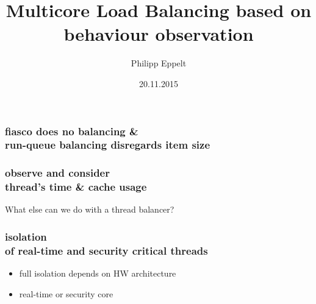 \documentclass[utf8,10pt]{beamer}
\title[]{Multicore Load Balancing based on behaviour observation}
\author{Philipp Eppelt}
\date{20.11.2015}
\begin{document}
\maketitle

\large

\newcommand{\ft}[1]{\frametitle{\hfill #1}}


\begin{frame}
  \frametitle{fiasco does no balancing \& \\ run-queue balancing disregards
  item size}
  \centering
  \begin{minipage}[l]{.49\columnwidth}
    
  \end{minipage}
  \begin{minipage}[r]{.49\columnwidth}
    
  \end{minipage}
\end{frame}


\begin{frame}
  \frametitle{observe and consider \\ thread's time \& cache usage}
  \centering
  \begin{minipage}[l]{.49\columnwidth}
    
  \end{minipage}
  \begin{minipage}[r]{.49\columnwidth}
    
  \end{minipage}
\end{frame}


\begin{frame}
  \centering
  What else can we do with a thread balancer?
\end{frame}


\begin{frame}
  \frametitle{isolation \\of real-time and security critical threads}

  \begin{itemize}
    \item full isolation depends on HW architecture
    \item real-time or security core
  \end{itemize}
\end{frame}
\end{document}
